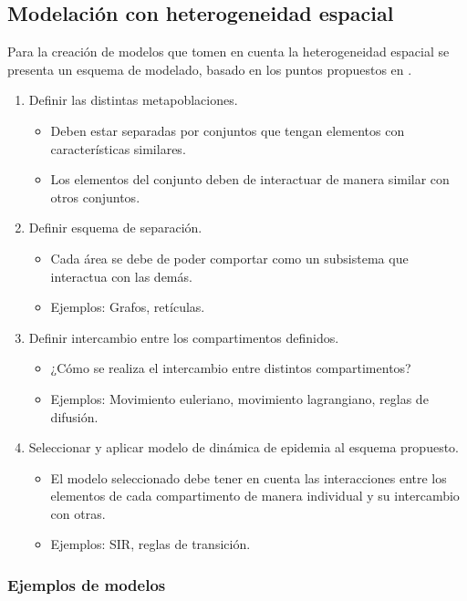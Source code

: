 \documentclass[fleqn,10pt]{SelfArx_063318} %
\begin{document}
\subsection{Modelación con heterogeneidad espacial}

Para la creación de modelos que tomen en cuenta la heterogeneidad espacial se presenta un esquema de modelado, basado
en los puntos propuestos en \cite{mainPresentation}.

\begin{enumerate}
    \item Definir las distintas metapoblaciones.
    \begin{itemize}
        \item Deben estar separadas por conjuntos que tengan elementos con características similares.
        \item Los elementos del conjunto deben de interactuar de manera similar con otros conjuntos.
    \end{itemize}
    \item Definir esquema de separación.
    \begin{itemize}
        \item Cada área se debe de poder comportar como un subsistema que interactua con las demás. 
        \item Ejemplos: Grafos, retículas.
    \end{itemize}
    \item Definir intercambio entre los compartimentos definidos.
    \begin{itemize}
        \item ¿Cómo se realiza el intercambio entre distintos compartimentos?
        \item Ejemplos: Movimiento euleriano, movimiento lagrangiano, reglas de difusión.
    \end{itemize}
    \item Seleccionar y aplicar modelo de dinámica de epidemia al esquema propuesto.
    \begin{itemize}
        \item El modelo seleccionado debe tener en cuenta las interacciones entre los elementos de cada
        compartimento de manera individual y su intercambio con otras.
        \item Ejemplos: SIR, reglas de transición. 
    \end{itemize}
\end{enumerate}

\subsubsection{Ejemplos de modelos}
\end{document}
